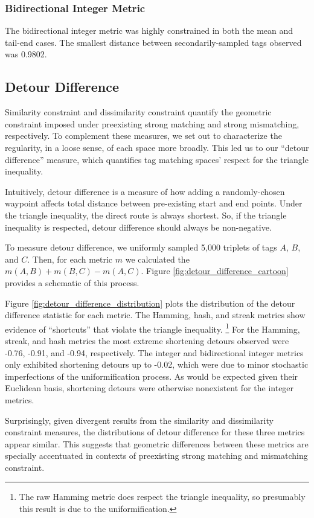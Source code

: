 \subsubsection{Bidirectional Integer Metric}

The bidirectional integer metric was highly constrained in both the mean and tail-end cases.
The smallest distance between secondarily-sampled tags observed was 0.9802.

\subsection{Detour Difference} \label{sec:detour_difference}



Similarity constraint and dissimilarity constraint quantify the geometric constraint imposed under preexisting strong matching and strong mismatching, respectively.
To complement these measures, we set out to characterize the regularity, in a loose sense, of each space more broadly.
This led us to our ``detour difference'' measure, which quantifies tag matching spaces' respect for the triangle inequality.

Intuitively, detour difference is a measure of how adding a randomly-chosen waypoint affects total distance between pre-existing start and end points.
Under the triangle inequality, the direct route is always shortest.
So, if the triangle inequality is respected, detour difference should always be non-negative.

To measure detour difference, we uniformly sampled 5,000 triplets of tags $A$, $B$, and $C$.
Then, for each metric $m$ we calculated the $m(A, B) + m(B, C) - m(A, C)$.
Figure \ref{fig:detour_difference_cartoon} provides a schematic of this process.

Figure \ref{fig:detour_difference_distribution} plots the distribution of the detour difference statistic for each metric.
The Hamming, hash, and streak metrics show evidence of ``shortcuts'' that violate the triangle inequality.%
\footnote{%
The raw Hamming metric does respect the triangle inequality, so presumably this result is due to the uniformification.
}
For the Hamming, streak, and hash metrics the most extreme shortening detours observed were -0.76, -0.91, and -0.94, respectively.
The integer and bidirectional integer metrics only exhibited shortening detours up to -0.02, which were due to minor stochastic imperfections of the uniformification process.
As would be expected given their Euclidean basis, shortening detours were otherwise nonexistent for the integer metrics.

Surprisingly, given divergent results from the similarity and dissimilarity constraint measures, the distributions of detour difference for these three metrics appear similar.
This suggests that geometric differences between these metrics are specially accentuated in contexts of preexisting strong matching and mismatching constraint.
